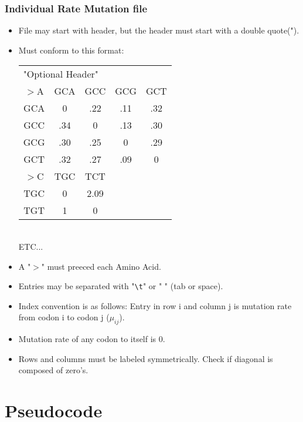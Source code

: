 \documentclass{article}
\begin{document}
		\subsubsection{Individual Rate Mutation file}
			\begin{itemize}
				\item File may start with header, but the header must start with a double quote(").
				\item Must conform to this format: \\
					\begin{tabular}{c c c c c}
						\multicolumn{5}{l}{"Optional Header"} \\
						$>$A & GCA & GCC & GCG & GCT \\
						GCA & 0 & .22 & .11 & .32 \\
						GCC & .34 & 0 & .13 & .30 \\
						GCG & .30 & .25 & 0 & .29 \\
						GCT & .32 & .27 & .09 & 0 \\
						$>$C & TGC & TCT \\
						TGC & 0 & 2.09 \\
						TGT & 1 & 0 \\
					\end{tabular} \\
					ETC...
				\item A "$>$" must preeced each Amino Acid.
				\item Entries may be separated with "\verb+\t+" or " " (tab or space).
				\item Index convention is as follows: Entry in row i and column j is mutation rate from 
					  codon i to codon j ($\mu_{ij}$).				
				\item Mutation rate of any codon to itself is 0.
				\item Rows and columns must be labeled symmetrically. Check if diagonal is composed of zero's.

			\end{itemize}
				

	
\section{Pseudocode}
\end{document}
